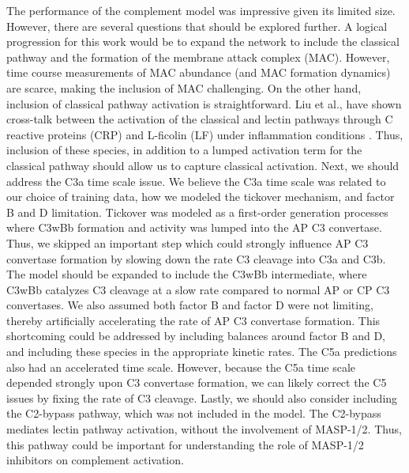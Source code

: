 \documentclass[12pt]{article}
\begin{document}
The performance of the complement model was impressive given its limited size.
However, there are several questions that should be explored further.
A logical progression for this work would be to expand the network to include the classical pathway and the formation of the membrane attack complex (MAC).
However, time course measurements of MAC abundance (and MAC formation dynamics) are scarce, making the inclusion of MAC challenging.
On the other hand, inclusion of classical pathway activation is straightforward.
Liu et al., have shown cross-talk between the activation of the classical and lectin pathways through C reactive proteins (CRP) and L-ficolin (LF) under inflammation conditions \cite{liu2011computational}. Thus, inclusion of these species, in addition to a lumped activation term for the classical pathway should allow us to capture classical activation.
Next, we should address the C3a time scale issue.
We believe the C3a time scale was related to our choice of training data, how we modeled the tickover mechanism, and factor B and D limitation.
Tickover was modeled as a first-order generation processes where C3wBb formation and activity was lumped into the AP C3 convertase.
Thus, we skipped an important step which could strongly influence AP C3 convertase formation by slowing down the rate C3 cleavage into C3a and C3b.
The model should be expanded to include the C3wBb intermediate, where C3wBb catalyzes C3 cleavage at a slow rate compared to normal AP or CP C3 convertases.
We also assumed both factor B and factor D were not limiting, thereby artificially accelerating the rate of AP C3 convertase formation.
This shortcoming could be addressed by including balances around factor B and D, and including these species in the appropriate kinetic rates.
The C5a predictions also had an accelerated time scale.
However, because the C5a time scale depended strongly upon C3 convertase formation, we can likely correct the C5 issues by fixing the rate of C3 cleavage.
Lastly, we should also consider including the C2-bypass pathway, which was not included in the model.
The C2-bypass mediates lectin pathway activation, without the involvement of MASP-1/2.
Thus, this pathway could be important for understanding the role of MASP-1/2 inhibitors on complement activation.
\end{document}
